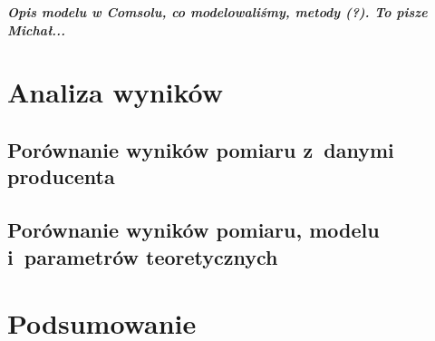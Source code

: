 \documentclass[12pt]{oska}
\newcommand{\comment}[1]{{\color{magenta}\emph{\textbf{#1}}}}
\begin{document}
	\comment{Opis modelu w Comsolu, co modelowaliśmy, metody (?). To pisze Michał...}

\section{Analiza wyników}

	\subsection{Porównanie wyników pomiaru z~danymi producenta}
	
	\subsection{Porównanie wyników pomiaru, modelu i~parametrów teoretycznych}

\section{Podsumowanie}

\printbibliography
\end{document}
